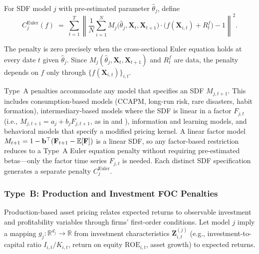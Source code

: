 \begin{definition}
\label{def:euler_penalty}
For SDF model $j$ with pre-estimated parameter $\hat{\theta}_j$, define
\begin{equation}
\label{eq:euler_penalty}
C_j^{\mathrm{Euler}}(f) \;=\;
\sum_{t=1}^{T}
\left\|
\frac{1}{N}\sum_{i=1}^{N}
M_j\bigl(\hat{\theta}_j, \mathbf{X}_t, \mathbf{X}_{t+1}\bigr)
\cdot
\bigl(f(\mathbf{X}_{i,t}) + R_t^f\bigr) - 1
\right\|^2.
\end{equation}
\end{definition}

\noindent
The penalty is zero precisely when the cross-sectional Euler equation
holds at every date $t$ given $\hat{\theta}_j$.
Since $M_j(\hat{\theta}_j, \mathbf{X}_t, \mathbf{X}_{t+1})$ and $R_t^f$ are data,
the penalty depends on $f$ only through $\{f(\mathbf{X}_{i,t})\}_{i,t}$.

\begin{remark}[Coverage]
Type~A penalties accommodate any model that specifies an SDF $M_{j,t+1}$.
This includes consumption-based models (CCAPM, long-run risk,
rare disasters, habit formation), intermediary-based models where the SDF
is linear in a factor $F_{j,t}$ (i.e., $M_{j,t+1} = a_j + b_j F_{j,t+1}$,
as in \citealp{hekrishnamurthy2013} and \citealp{adrianetulamuir2014}),
information and learning models, and behavioral models that specify
a modified pricing kernel.
A linear factor model $M_{t+1} = 1 - \mathbf{b}^\top(\mathbf{F}_{t+1} - \mathbb{E}[\mathbf{F}])$
is a linear SDF, so any factor-based restriction reduces to a Type~A
Euler equation penalty without requiring pre-estimated betas---only
the factor time series $F_{j,t}$ is needed.
Each distinct SDF specification generates a separate penalty $C_j^{\mathrm{Euler}}$.
\end{remark}

\subsubsection{Type~B: Production and Investment FOC Penalties}
\label{sub:production}

Production-based asset pricing relates expected returns to observable
investment and profitability variables through firms' first-order conditions.
Let model $j$ imply a mapping $g_j: \mathbb{R}^{d_j} \to \mathbb{R}$
from investment characteristics $\mathbf{Z}_{i,t}^{(j)}$
(e.g., investment-to-capital ratio $I_{i,t}/K_{i,t}$, return on equity
$\mathrm{ROE}_{i,t}$, asset growth) to expected returns.

